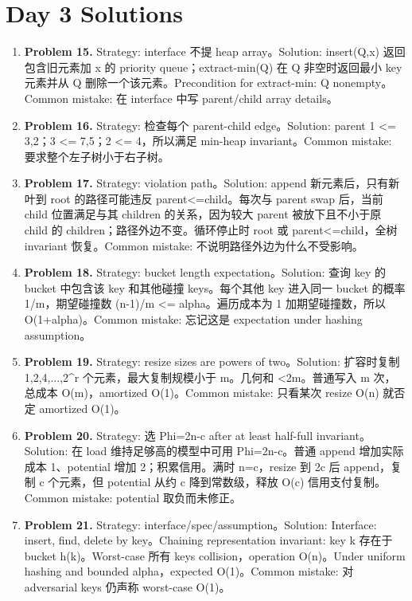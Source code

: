 \documentclass[11pt]{ctexart}
\begin{document}
\section{Day 3 Solutions}
\begin{enumerate}
  \item \textbf{Problem 15.} Strategy: interface 不提 heap array。Solution: insert(Q,x) 返回包含旧元素加 x 的 priority queue；extract-min(Q) 在 Q 非空时返回最小 key 元素并从 Q 删除一个该元素。Precondition for extract-min: Q nonempty。Common mistake: 在 interface 中写 parent/child array details。
  \item \textbf{Problem 16.} Strategy: 检查每个 parent-child edge。Solution: parent 1 <= 3,2；3 <= 7,5；2 <= 4，所以满足 min-heap invariant。Common mistake: 要求整个左子树小于右子树。
  \item \textbf{Problem 17.} Strategy: violation path。Solution: append 新元素后，只有新叶到 root 的路径可能违反 parent<=child。每次与 parent swap 后，当前 child 位置满足与其 children 的关系，因为较大 parent 被放下且不小于原 child 的 children；路径外边不变。循环停止时 root 或 parent<=child，全树 invariant 恢复。Common mistake: 不说明路径外边为什么不受影响。
  \item \textbf{Problem 18.} Strategy: bucket length expectation。Solution: 查询 key 的 bucket 中包含该 key 和其他碰撞 keys。每个其他 key 进入同一 bucket 的概率 1/m，期望碰撞数 (n-1)/m <= alpha。遍历成本为 1 加期望碰撞数，所以 O(1+alpha)。Common mistake: 忘记这是 expectation under hashing assumption。
  \item \textbf{Problem 19.} Strategy: resize sizes are powers of two。Solution: 扩容时复制 1,2,4,...,2\textasciicircum{}r 个元素，最大复制规模小于 m。几何和 <2m。普通写入 m 次，总成本 O(m)，amortized O(1)。Common mistake: 只看某次 resize O(n) 就否定 amortized O(1)。
  \item \textbf{Problem 20.} Strategy: 选 Phi=2n-c after at least half-full invariant。Solution: 在 load 维持足够高的模型中可用 Phi=2n-c。普通 append 增加实际成本 1、potential 增加 2；积累信用。满时 n=c，resize 到 2c 后 append，复制 c 个元素，但 potential 从约 c 降到常数级，释放 O(c) 信用支付复制。Common mistake: potential 取负而未修正。
  \item \textbf{Problem 21.} Strategy: interface/spec/assumption。Solution: Interface: insert, find, delete by key。Chaining representation invariant: key k 存在于 bucket h(k)。Worst-case 所有 keys collision，operation O(n)。Under uniform hashing and bounded alpha，expected O(1)。Common mistake: 对 adversarial keys 仍声称 worst-case O(1)。
\end{enumerate}
\end{document}

